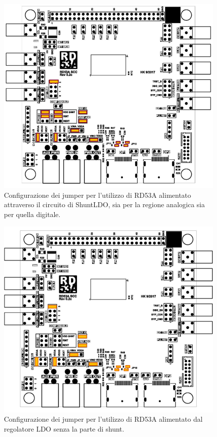\begin{figure}
\centering
\includegraphics[scale=.3]{Immagini/SLDOmode}
\caption{Configurazione dei jumper per l'utilizzo di RD53A alimentato attraverso il circuito di ShuntLDO, sia per la regione analogica sia per quella digitale.}
\label{SLDOmode}
\end{figure}
\begin{figure}
\centering
\includegraphics[scale=.3]{Immagini/LDOmodeDefault}
\caption{Configurazione dei jumper per l'utilizzo di RD53A alimentato dal regolatore LDO senza la parte di shunt.}
\label{LDOmode}
\end{figure}
